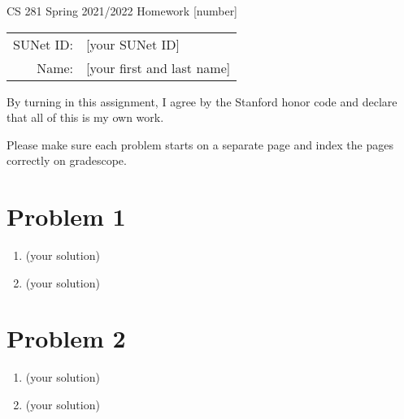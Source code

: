 \documentclass[12pt]{article}
\begin{document}
\begin{center}
{\Large CS 281 Spring 2021/2022 Homework [number]}

\begin{tabular}{rl}
SUNet ID: & [your SUNet ID] \\
Name: & [your first and last name] \\
\end{tabular}
\end{center}

By turning in this assignment, I agree by the Stanford honor code and declare
that all of this is my own work.

Please make sure each problem starts on a separate page and index the pages correctly on gradescope.

\section*{Problem 1}

\begin{enumerate}[label=(\alph*)]
  \item (your solution)
  \item (your solution)
\end{enumerate}

\newpage
\section*{Problem 2}

\begin{enumerate}[label=(\alph*)]
  \item (your solution)
  \item (your solution)
\end{enumerate}
\end{document}
